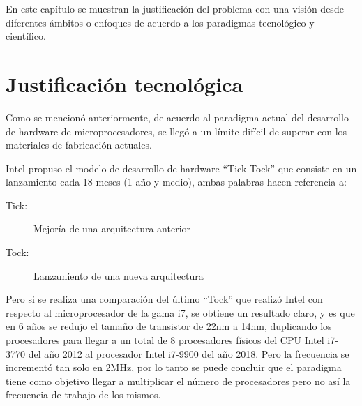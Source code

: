 \documentclass[../main.tex]{subfiles}
\begin{document}
\espacio

  En este capítulo se muestran la justificación del problema con una visión desde diferentes ámbitos o enfoques de acuerdo a los paradigmas tecnológico y científico.

  \section{Justificación tecnológica}

  Como se mencionó anteriormente, de acuerdo al paradigma actual del desarrollo de hardware de microprocesadores, se llegó a un límite difícil de superar con los materiales de fabricación actuales.

  Intel propuso el modelo de desarrollo de hardware ``Tick-Tock'' que consiste en un lanzamiento cada 18 meses (1 año y medio), ambas palabras hacen referencia a:

  \begin{description}
    \item[Tick:] Mejoría de una arquitectura anterior
    \item[Tock:] Lanzamiento de una nueva arquitectura
  \end{description}

  Pero si se realiza una comparación del último ``Tock'' que realizó Intel con respecto al microprocesador de la gama i7, se obtiene un resultado claro, y es que en 6 años se redujo el tamaño de transistor de 22nm a 14nm, duplicando los procesadores para llegar a un total de 8 procesadores físicos del CPU Intel i7-3770 del año 2012 al procesador Intel i7-9900 del año 2018. Pero la frecuencia se incrementó tan solo en 2MHz, por lo tanto se puede concluir que el paradigma tiene como objetivo llegar a multiplicar el número de procesadores pero no así la frecuencia de trabajo de los mismos.
\end{document}
